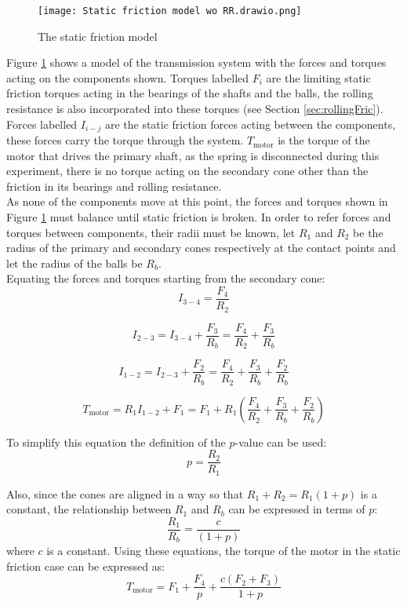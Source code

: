 \documentclass[12pt]{article}
\begin{document}
\begin{figure}[h]
    \centering
    \texttt{[image: Static friction model wo RR.drawio.png]}
    \caption{The static friction model}
    \label{fig:staticFricModel}
\end{figure}

Figure \ref{fig:staticFricModel} shows a model of the transmission system with the forces and torques acting on the components shown. Torques labelled $F_i$ are the limiting static friction torques acting in the bearings of the shafts and the balls, the rolling resistance is also incorporated into these torques (see Section \ref{sec:rollingFric}). Forces labelled $I_{i-j}$ are the static friction forces acting between the components, these forces carry the torque through the system. $T_{\text{motor}}$ is the torque of the motor that drives the primary shaft, as the spring is disconnected during this experiment, there is no torque acting on the secondary cone other than the friction in its bearings and rolling resistance. \\

As none of the components move at this point, the forces and torques shown in Figure \ref{fig:staticFricModel} must balance until static friction is broken. In order to refer forces and torques between components, their radii must be known, let $R_1$ and $R_2$ be the radius of the primary and secondary cones  respectively at the contact points and let the radius of the balls be $R_b.$\\

Equating the forces and torques starting from the secondary cone:\\

$$I_{3-4} = \frac{F_4}{R_2}$$

$$I_{2-3} = I_{3-4}  + \frac{F_3}{R_b} = \frac{F_4}{R_2} + \frac{F_3}{R_b}$$

$$I_{1-2} = I_{2-3} + \frac{F_2}{R_b} = \frac{F_4}{R_2} + \frac{F_3}{R_b}  + \frac{F_2}{R_b}$$

$$T_{\text{motor}} = R_1 I_{1-2} + F_1 = F_1 + R_1 \left(\frac{F_4}{R_2}  + \frac{F_3}{R_b}  + \frac{F_2}{R_b} \right) $$

To simplify this equation the definition of the $p$-value can be used:
$$p=\frac{R_2}{R_1}$$

Also, since the cones are aligned in a way so that $R_1+R_2 = R_1(1+p)$ is a constant, the relationship between $R_1$ and $R_b$ can be expressed in terms of $p$:
$$\frac{R_1}{R_b} = \frac{c}{(1+p)}$$
where $c$ is a constant.
Using these equations, the torque of the motor in the static friction case can be expressed as:
$$T_{\text{motor}} = F_1 + \frac{F_4}{p} + \frac{c(F_2+F_3)}{1+p}$$
\end{document}
